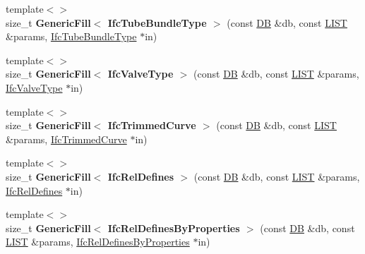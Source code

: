 \begin{DoxyCompactItemize}
\item 
\hypertarget{namespace_assimp_1_1_s_t_e_p_a7121bb9e73d1f80ac44c6a8f4a55fc12}{{\footnotesize template$<$$>$ }\\size\+\_\+t {\bfseries Generic\+Fill$<$ Ifc\+Tube\+Bundle\+Type $>$} (const \hyperlink{class_assimp_1_1_s_t_e_p_1_1_d_b}{D\+B} \&db, const \hyperlink{class_assimp_1_1_s_t_e_p_1_1_e_x_p_r_e_s_s_1_1_l_i_s_t}{L\+I\+S\+T} \&params, \hyperlink{struct_assimp_1_1_i_f_c_1_1_ifc_tube_bundle_type}{Ifc\+Tube\+Bundle\+Type} $\ast$in)}\label{namespace_assimp_1_1_s_t_e_p_a7121bb9e73d1f80ac44c6a8f4a55fc12}

\item 
\hypertarget{namespace_assimp_1_1_s_t_e_p_a7061538de4a220f3dfa5f68b826f12a8}{{\footnotesize template$<$$>$ }\\size\+\_\+t {\bfseries Generic\+Fill$<$ Ifc\+Valve\+Type $>$} (const \hyperlink{class_assimp_1_1_s_t_e_p_1_1_d_b}{D\+B} \&db, const \hyperlink{class_assimp_1_1_s_t_e_p_1_1_e_x_p_r_e_s_s_1_1_l_i_s_t}{L\+I\+S\+T} \&params, \hyperlink{struct_assimp_1_1_i_f_c_1_1_ifc_valve_type}{Ifc\+Valve\+Type} $\ast$in)}\label{namespace_assimp_1_1_s_t_e_p_a7061538de4a220f3dfa5f68b826f12a8}

\item 
\hypertarget{namespace_assimp_1_1_s_t_e_p_ab5caf0e20718343afec6a311b4dff5d9}{{\footnotesize template$<$$>$ }\\size\+\_\+t {\bfseries Generic\+Fill$<$ Ifc\+Trimmed\+Curve $>$} (const \hyperlink{class_assimp_1_1_s_t_e_p_1_1_d_b}{D\+B} \&db, const \hyperlink{class_assimp_1_1_s_t_e_p_1_1_e_x_p_r_e_s_s_1_1_l_i_s_t}{L\+I\+S\+T} \&params, \hyperlink{struct_assimp_1_1_i_f_c_1_1_ifc_trimmed_curve}{Ifc\+Trimmed\+Curve} $\ast$in)}\label{namespace_assimp_1_1_s_t_e_p_ab5caf0e20718343afec6a311b4dff5d9}

\item 
\hypertarget{namespace_assimp_1_1_s_t_e_p_a6c75c86a62875cdb2954efdc0d0b5936}{{\footnotesize template$<$$>$ }\\size\+\_\+t {\bfseries Generic\+Fill$<$ Ifc\+Rel\+Defines $>$} (const \hyperlink{class_assimp_1_1_s_t_e_p_1_1_d_b}{D\+B} \&db, const \hyperlink{class_assimp_1_1_s_t_e_p_1_1_e_x_p_r_e_s_s_1_1_l_i_s_t}{L\+I\+S\+T} \&params, \hyperlink{struct_assimp_1_1_i_f_c_1_1_ifc_rel_defines}{Ifc\+Rel\+Defines} $\ast$in)}\label{namespace_assimp_1_1_s_t_e_p_a6c75c86a62875cdb2954efdc0d0b5936}

\item 
\hypertarget{namespace_assimp_1_1_s_t_e_p_a8d35a976ff60a222a381f9124afaefbf}{{\footnotesize template$<$$>$ }\\size\+\_\+t {\bfseries Generic\+Fill$<$ Ifc\+Rel\+Defines\+By\+Properties $>$} (const \hyperlink{class_assimp_1_1_s_t_e_p_1_1_d_b}{D\+B} \&db, const \hyperlink{class_assimp_1_1_s_t_e_p_1_1_e_x_p_r_e_s_s_1_1_l_i_s_t}{L\+I\+S\+T} \&params, \hyperlink{struct_assimp_1_1_i_f_c_1_1_ifc_rel_defines_by_properties}{Ifc\+Rel\+Defines\+By\+Properties} $\ast$in)}\label{namespace_assimp_1_1_s_t_e_p_a8d35a976ff60a222a381f9124afaefbf}


\end{DoxyCompactItemize}

